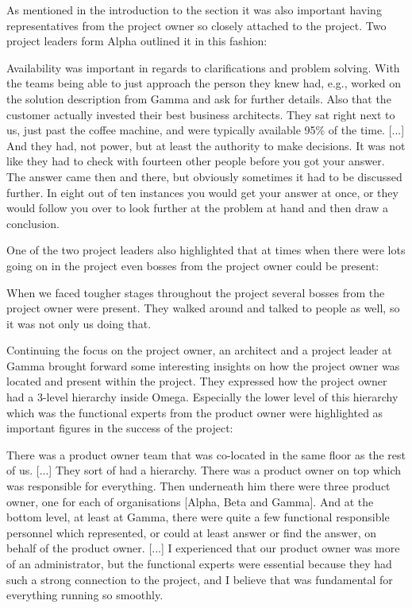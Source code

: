 As mentioned in the introduction to the section it was also important having representatives from the project owner so closely attached to the project. Two project leaders form Alpha outlined it in this fashion:

\begin{fancyquotes}
Availability was important in regards to clarifications and problem solving. With the teams being able to just approach the person they knew had, e.g., worked on the solution description from Gamma and ask for further details. Also that the customer actually invested their best business architects. They sat right next to us, just past the coffee machine, and were typically available 95\% of the time. [...] And they had, not power, but at least the authority to make decisions. It was not like they had to check with fourteen other people before you got your answer. The answer came then and there, but obviously sometimes it had to be discussed further. In eight out of ten instances you would get your answer at once, or they would follow you over to look further at the problem at hand and then draw a conclusion.
\end{fancyquotes}

One of the two project leaders also highlighted that at times when there were lots going on in the project even bosses from the project owner could be present:

\begin{fancyquotes}
When we faced tougher stages throughout the project several bosses from the project owner were present. They walked around and talked to people as well, so it was not only us doing that.
\end{fancyquotes}

Continuing the focus on the project owner, an architect and a project leader at Gamma brought forward some interesting insights on how the project owner was located and present within the project. They expressed how the project owner had a 3-level hierarchy inside Omega. Especially the lower level of this hierarchy which was the functional experts from the product owner were highlighted as important figures in the success of the project:

\begin{fancyquotes}
There was a product owner team that was co-located in the same floor as the rest of us. [...] They sort of had a hierarchy. There was a product owner on top which was responsible for everything. Then underneath him there were three product owner, one for each of organisations [Alpha, Beta and Gamma]. And at the bottom level, at least at Gamma, there were quite a few functional responsible personnel which represented, or could at least answer or find the answer, on behalf of the product owner. [...] I experienced that our product owner was more of an administrator, but the functional experts were essential because they had such a strong connection to the project, and I believe that was fundamental for everything running so smoothly.
\end{fancyquotes}

